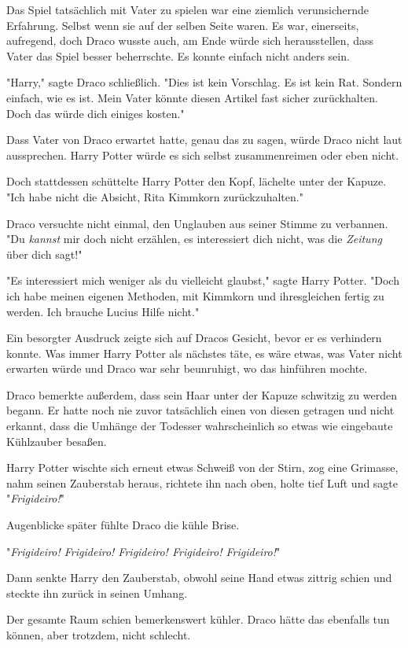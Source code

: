 {Das Spiel tatsächlich mit Vater zu spielen war eine ziemlich verunsichernde Erfahrung. Selbst wenn sie auf der selben Seite waren. Es war, einerseits, aufregend, doch Draco wusste auch, am Ende würde sich herausstellen, dass Vater das Spiel besser beherrschte. Es konnte einfach nicht anders sein.

"Harry," sagte Draco schließlich. "Dies ist kein Vorschlag. Es ist kein Rat. Sondern einfach, wie es ist. Mein Vater könnte diesen Artikel fast sicher zurückhalten. Doch das würde dich einiges kosten."

Dass Vater von Draco erwartet hatte, genau das zu sagen, würde Draco nicht laut aussprechen. Harry Potter würde es sich selbst zusammenreimen oder eben nicht.

Doch stattdessen schüttelte Harry Potter den Kopf, lächelte unter der Kapuze. "Ich habe nicht die Absicht, Rita Kimmkorn zurückzuhalten."

Draco versuchte nicht einmal, den Unglauben aus seiner Stimme zu verbannen. "Du \emph{kannst} mir doch nicht erzählen, es interessiert dich nicht, was die \emph{Zeitung} über dich sagt!"

"Es interessiert mich weniger als du vielleicht glaubst," sagte Harry Potter. "Doch ich habe meinen eigenen Methoden, mit Kimmkorn und ihresgleichen fertig zu werden. Ich brauche Lucius Hilfe nicht."

Ein besorgter Ausdruck zeigte sich auf Dracos Gesicht, bevor er es verhindern konnte. Was immer Harry Potter als nächstes täte, es wäre etwas, was Vater nicht erwarten würde und Draco war sehr beunruhigt, wo das hinführen mochte.

Draco bemerkte außerdem, dass sein Haar unter der Kapuze schwitzig zu werden begann. Er hatte noch nie zuvor tatsächlich einen von diesen getragen und nicht erkannt, dass die Umhänge der Todesser wahrscheinlich so etwas wie eingebaute Kühlzauber besaßen.

Harry Potter wischte sich erneut etwas Schweiß von der Stirn, zog eine Grimasse, nahm seinen Zauberstab heraus, richtete ihn nach oben, holte tief Luft und sagte "\emph{Frigideiro!}"

Augenblicke später fühlte Draco die kühle Brise.

"\emph{Frigideiro! Frigideiro! Frigideiro! Frigideiro! Frigideiro!}"

Dann senkte Harry den Zauberstab, obwohl seine Hand etwas zittrig schien und steckte ihn zurück in seinen Umhang.

Der gesamte Raum schien bemerkenswert kühler. Draco hätte das ebenfalls tun können, aber trotzdem, nicht schlecht.

}
